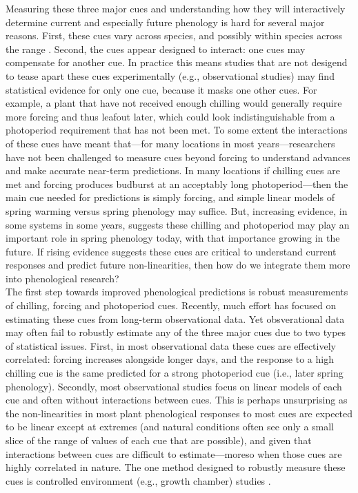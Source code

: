 \documentclass[11pt,letter]{article}
\begin{document}
Measuring these three major cues and understanding how they will interactively determine current and especially future phenology is hard for several major reasons. First, these cues vary across species, and possibly within species across the range  \citep{vitasse2009,harrington2015}. Second, the cues appear designed to interact: one cues may compensate for another cue. In practice this means studies that are not desigend to tease apart these cues experimentally (e.g., observational studies) may find statistical evidence for only one cue, because it masks one other cues. For example, a plant that have not received enough chilling would generally require more forcing and thus leafout later, which could look indistinguishable from a photoperiod requirement that has not been met. To some extent the interactions of these cues have meant that---for many locations in most years---researchers have not been challenged to measure cues beyond forcing to understand advances and make accurate near-term predictions. In many locations if chilling cues are met and forcing produces budburst at an acceptably long photoperiod---then the main cue needed for predictions is simply forcing, and simple linear models of spring warming versus spring phenology may suffice. But, increasing evidence, in some systems in some years, suggests these chilling and photoperiod may play an important role in spring phenology today, with that importance growing in the future. If rising evidence suggests these cues are critical to understand current responses and predict future non-linearities, then how do we integrate them more into phenological research? \\%

The first step towards improved phenological predictions is robust measurements of chilling, forcing and photoperiod cues. Recently, much effort has focused on estimating these cues from long-term observational data. Yet obsverational data may often fail to robustly estimate any of the three major cues due to two types of statistical issues. First, in most observational data these cues are effectively correlated: forcing increases alongside longer days, and the response to a high chilling cue is the same predicted for a strong photoperiod cue (i.e., later spring phenology). Secondly, most observational studies focus on linear models of each cue and often without interactions between cues. This is perhaps unsurprising as the non-linearities in most plant phenological responses to most cues are expected to be linear except at extremes (and natural conditions often see only a small slice of the range of values of each cue that are possible), and given that interactions between cues are difficult to estimate---moreso when those cues are highly correlated in nature. The one method designed to robustly measure these cues is controlled environment (e.g., growth chamber) studies \citep{nagano2012,satake2013}.\\
\end{document}
